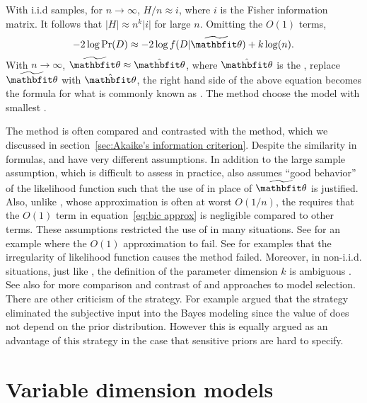 With i.i.d samples, for $n\to\infty$, $H/n \approx i$, where $i$ is the Fisher
information matrix. It follows that $\lvert H \rvert \approx n^k \lvert i
\rvert$ for large $n$. Omitting the $O(1)$ terms,
\begin{equation}
  -2\log\Pr(D) \approx -2\log f(D|\tbth) + k\log(n).
\end{equation}
With $n\to\infty$, $\tbth\approx\hat{\bth}$, where $\hat{\bth}$ is the \mle,
replace $\tbth$ with $\hat{\bth}$, the right hand side of the above equation
becomes the formula for what is commonly known as \bic. The \bic method choose
the model with smallest \bic.

The \bic method is often compared and contrasted with the \aic method, which
we discussed in section~\ref{sec:Akaike's information criterion}. Despite the
similarity in formulas, \aic and \bic have very different assumptions. In
addition to the large sample assumption, which is difficult to assess in
practice, \bic also assumes ``good behavior'' of the likelihood function such
that the use of \mle in place of $\tbth$ is justified. Also, unlike \aic,
whose approximation is often at worst $O(1/n)$, the \bic requires that the
$O(1)$ term in equation~\eqref{eq:bic approx} is negligible compared to other
terms. These assumptions restricted the use of \bic in many situations. See
\textcite{Gelfand1994} for an example where the $O(1)$ approximation to fail.
See \textcite{Berger2001} for examples that the irregularity of likelihood
function causes the \bic method failed. Moreover, in non-i.i.d. situations,
just like \aic, the definition of the parameter dimension $k$ is ambiguous
\parencite{Spiegelhalter1998, Kass1995}. See also \textcite[][chap.~5 and
chap.~6]{Burnham2002} for more comparison and contrast of \aic and \bic
approaches to model selection. There are other criticism of the \bic strategy.
For example \textcite[][chap.~7]{Robert2007} argued that the \bic strategy
eliminated the subjective input into the Bayes modeling since the value of
\bic does not depend on the prior distribution. However this is equally argued
as an advantage of this strategy in the case that sensitive priors are hard to
specify.

\section{Variable dimension models}
\label{sec:Variable dimension models}

